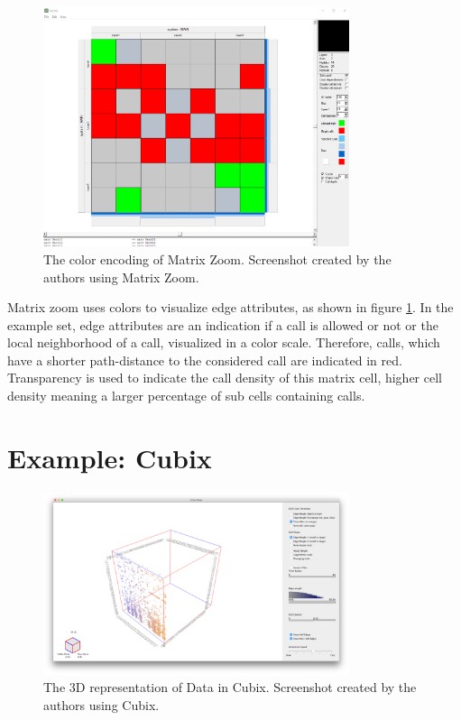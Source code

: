 \begin{figure}[tp]
\centering
\includegraphics[width=0.8\textwidth]{images/matrixzoom_cell}
\caption[Cell Visualization in Matrix Zoom]{The color encoding of Matrix Zoom. Screenshot created by the authors using Matrix Zoom. \citep[227--232]{ham-ivis-2003}\label{fig:zell_matrixzoom}}
\end{figure}

Matrix zoom uses colors to visualize edge attributes, as shown in figure \ref{fig:zell_matrixzoom}. In the example set, edge attributes are an indication if a call is allowed or not or the local neighborhood of a call, visualized in a color scale. Therefore, calls, which have a shorter path-distance to the considered call are indicated in red. Transparency is used to indicate the call density of this matrix cell, higher cell density meaning a larger percentage of sub cells containing calls. \citep[227--232]{ham-ivis-2003}


\section{Example: Cubix}

\begin{figure}[tp]
\centering
\includegraphics[width=0.8\textwidth]{images/cubix3d_cell}
\caption[3D Data Representation in Cubix]{The 3D representation of Data in Cubix. Screenshot created by the authors using Cubix.\citep[877--886]{bach-cubix-2014}\label{fig:cell_cubix3d}}
\end{figure}

